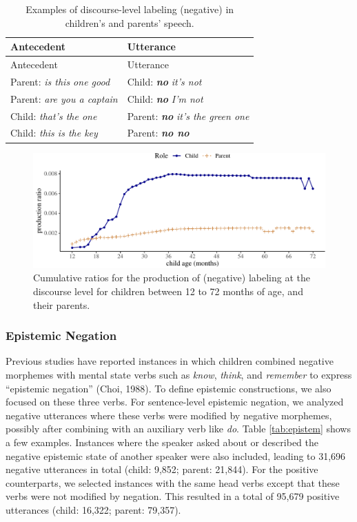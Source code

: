 \documentclass[
  english,
  man,floatsintext]{apa6}
\begin{document}
\begin{longtable}[]{@{}ll@{}}
\caption{\label{tab:dislabel} Examples of discourse-level labeling (negative) in children's and parents' speech.}\tabularnewline
\toprule
Antecedent & Utterance \\
\midrule
\endfirsthead
\toprule
Antecedent & Utterance \\
\midrule
\endhead
Parent: \emph{is this one good} & Child: \textbf{\emph{no}} \emph{it's not} \\
Parent: \emph{are you a captain} & Child: \textbf{\emph{no}} \emph{I'm not} \\
Child: \emph{that's the one} & Parent: \textbf{\emph{no}} \emph{it's the green one} \\
Child: \emph{this is the key} & Parent: \textbf{\emph{no no}} \\
\bottomrule
\end{longtable}

\begin{figure}[H]

{\centering \includegraphics{neg_construction_article_files/figure-latex/learningdiscourse-1} 

}

\caption{Cumulative ratios for the production of (negative) labeling at the discourse level for children between 12 to 72 months of age, and their parents.}\label{fig:learningdiscourse}
\end{figure}

\hypertarget{epistemic-negation}{%
\subsubsection{Epistemic Negation}\label{epistemic-negation}}

Previous studies have reported instances in which children combined negative morphemes with mental state verbs such as \emph{know}, \emph{think}, and \emph{remember} to express ``epistemic negation'' (Choi, 1988). To define epistemic constructions, we also focused on these three verbs. For sentence-level epistemic negation, we analyzed negative utterances where these verbs were modified by negative morphemes, possibly after combining with an auxiliary verb like \emph{do}. Table \ref{tab:epistem} shows a few examples. Instances where the speaker asked about or described the negative epistemic state of another speaker were also included, leading to 31,696 negative utterances in total (child: 9,852; parent: 21,844). For the positive counterparts, we selected instances with the same head verbs except that these verbs were not modified by negation. This resulted in a total of 95,679 positive utterances (child: 16,322; parent: 79,357).
\end{document}
